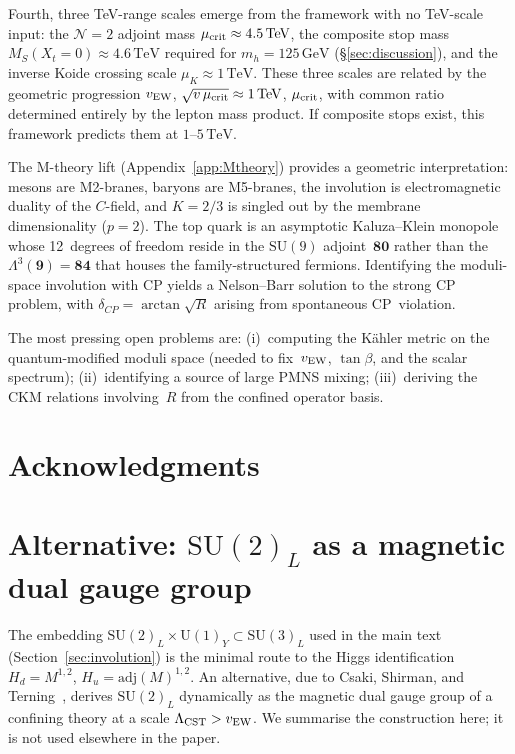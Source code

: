 \documentclass[12pt,a4paper]{article}
\newcommand{\SU}{\mathrm{SU}}
\newcommand{\UU}{\mathrm{U}}
\newcommand{\adj}{\mathrm{adj}}
\newcommand{\GeV}{\,\mathrm{GeV}}
\newcommand{\TeV}{\,\mathrm{TeV}}
\begin{document}
Fourth, three TeV-range scales emerge from the framework
with no TeV-scale input:
the $\mathcal{N}=2$ adjoint mass
$\mu_{\rm crit} \approx 4.5\TeV$, the composite stop mass
$M_S(X_t{=}0) \approx 4.6\TeV$ required for $m_h = 125\GeV$
(\S\ref{sec:discussion}),
and the inverse Koide crossing scale $\mu_K \approx 1\TeV$.
These three scales are related by the geometric progression
$v_{\rm EW}$, $\sqrt{v\,\mu_{\rm crit}} \approx 1\TeV$,
$\mu_{\rm crit}$, with common ratio determined entirely by the
lepton mass product. If composite stops exist, this framework
predicts them at $1$--$5\TeV$.

The M-theory lift (Appendix~\ref{app:Mtheory}) provides a
geometric interpretation: mesons are M2-branes, baryons are
M5-branes, the involution is electromagnetic duality of the
$C$-field, and $K = 2/3$ is singled out by the membrane
dimensionality ($p = 2$).  The top quark is an asymptotic
Kaluza--Klein monopole whose 12~degrees of freedom reside in the
$\SU(9)$ adjoint~$\mathbf{80}$ rather than the
$\Lambda^3(\mathbf{9}) = \mathbf{84}$ that houses the
family-structured fermions.  Identifying the moduli-space involution
with CP yields a Nelson--Barr solution to the strong CP problem,
with $\delta_{CP} = \arctan\!\sqrt{R}$ arising from spontaneous
CP~violation.

The most pressing open problems are: (i)~computing the
K\"ahler metric on the quantum-modified moduli space (needed to
fix~$v_{\rm EW}$, $\tan\beta$, and the scalar spectrum);
(ii)~identifying a source of large PMNS mixing; (iii)~deriving
the CKM relations involving~$R$ from the confined operator basis.


\section*{Acknowledgments}



\appendix
\section{Alternative: $\SU(2)_L$ as a magnetic dual gauge group}
\label{app:CST}

The embedding $\SU(2)_L \times \UU(1)_Y \subset \SU(3)_L$ used in
the main text (Section~\ref{sec:involution}) is the minimal route to
the Higgs identification $H_d = M^{1,2}$, $H_u = \adj(M)^{1,2}$.
An alternative, due to Csaki, Shirman, and
Terning~\cite{Csaki:2011xn}, derives $\SU(2)_L$ dynamically as the
magnetic dual gauge group of a confining theory at a scale
$\Lambda_{\rm CST} > v_{\rm EW}$.  We summarise the construction
here; it is not used elsewhere in the paper.
\end{document}
